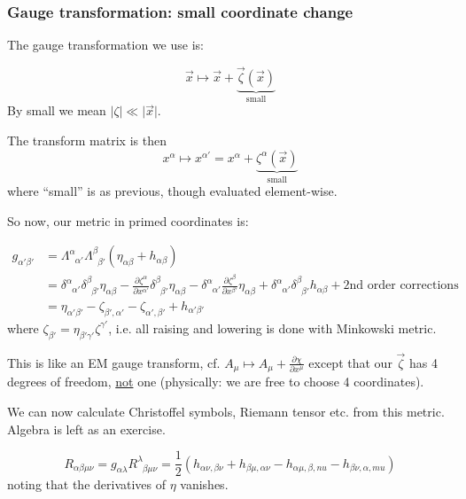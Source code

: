 \documentclass[a4paper]{article} %
\begin{document}
\subsubsection{Gauge transformation: small coordinate change}

The gauge transformation we use is:

\begin{equation}
\vec{x} \mapsto \vec{x} + \underbrace{\vec{\zeta}(\vec{x})}_{\text{small}}
\end{equation}
By small we mean $\lvert \zeta \rvert \ll \lvert \vec{x} \rvert$.

The transform matrix is then
\begin{equation}
x^{\alpha} \mapsto x^{\alpha'} = x^{\alpha} + \underbrace{\zeta^{\alpha}(\vec{x})}_{\text{small}}
\end{equation}
where ``small'' is as previous, though evaluated element-wise.

So now, our metric in primed coordinates is:

\begin{align}
g_{\alpha'\beta'}&=\Lambda^{\alpha}_{\phantom{\alpha}\alpha'} \Lambda^{\beta}_{\phantom{\beta}\beta'}
(\eta_{\alpha\beta}+h_{\alpha\beta})\\
&=\delta^{\alpha}_{\phantom{\alpha}\alpha'}\delta^{\beta}_{\phantom{\beta}\beta'}\eta_{\alpha\beta}
-\frac{\partial \zeta^{\alpha}}{\partial x^{\alpha'}} \delta^{\beta}_{\phantom{\beta}\beta'}\eta_{\alpha \beta}
-\delta^{\alpha}_{\phantom{\alpha}\alpha'}\frac{\partial \zeta^{\beta}}{\partial x^{\beta'}}\eta_{\alpha\beta}
+\delta^{\alpha}_{\phantom{\alpha}\alpha'}\delta^{\beta}_{\phantom{\beta}\beta'}h_{\alpha\beta}
+\text{2nd order corrections}\\
&=\eta_{\alpha'\beta'}-\zeta_{\beta', \alpha'}-\zeta_{\alpha', \beta'}+h_{\alpha'\beta'}
\end{align}
where $\zeta_{\beta'}=\eta_{\beta'\gamma'}\zeta^{\gamma'}$, i.e. all raising and lowering is done with Minkowski metric.

This is like an EM gauge transform, cf. $A_{\mu}\mapsto A_{\mu}+\frac{\partial \chi}{\partial x^{\mu}}$ except that our
$\vec{\zeta}$ has 4 degrees of freedom, \underline{not} one (physically: we are free to choose 4 coordinates).

We can now calculate Christoffel symbols, Riemann tensor etc. from this metric. Algebra is left as an exercise.

\begin{equation}
R_{\alpha\beta\mu\nu}=g_{\alpha \lambda} R^{\lambda}_{\phantom{\lambda}\beta\mu\nu}
=\frac{1}{2}\left(h_{\alpha\nu,\beta\nu}+h_{\beta\mu,\alpha\nu}-h_{\alpha\mu,\beta,nu}-h_{\beta\nu,\alpha,mu}\right)
\end{equation}
noting that the derivatives of $\eta$ vanishes.
\end{document}
